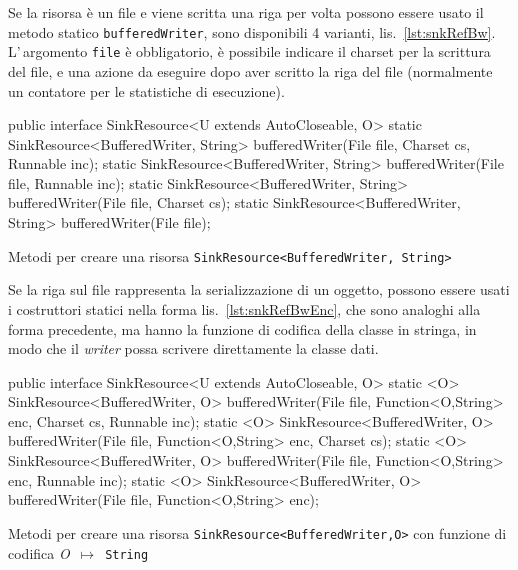 Se la risorsa è un file e viene scritta una riga per volta possono essere usato
il metodo statico \texttt{bufferedWriter}, sono disponibili 4 varianti,
lis.~\ref{lst:snkRefBw}. L'\,argomento \texttt{file} è obbligatorio, è possibile
indicare il charset per la scrittura del file, e una azione da eseguire dopo
aver scritto la riga del file (normalmente un contatore per le statistiche di
esecuzione).

\begin{elisting}[!htb]
\begin{javacode}
public interface SinkResource<U extends AutoCloseable, O> {
    static SinkResource<BufferedWriter, String> bufferedWriter(File file, Charset cs, Runnable inc);
    static SinkResource<BufferedWriter, String> bufferedWriter(File file, Runnable inc);
    static SinkResource<BufferedWriter, String> bufferedWriter(File file, Charset cs);
    static SinkResource<BufferedWriter, String> bufferedWriter(File file);
}
\end{javacode}
\caption{Metodi per creare una risorsa \texttt{SinkResource<BufferedWriter, String>}}
\label{lst:snkRefBw}
\end{elisting}

Se la riga sul file rappresenta la serializzazione di un oggetto, possono essere
usati i costruttori statici nella forma lis.~\ref{lst:snkRefBwEnc}, che sono
analoghi alla forma precedente, ma hanno la funzione di codifica della classe
in stringa, in modo che il \textit{writer} possa scrivere direttamente la classe
dati.

\begin{elisting}[!htb]
\begin{javacode}
public interface SinkResource<U extends AutoCloseable, O> {
    static <O> SinkResource<BufferedWriter, O> bufferedWriter(File file, Function<O,String> enc, Charset cs,
                                                              Runnable inc);
    static <O> SinkResource<BufferedWriter, O> bufferedWriter(File file, Function<O,String> enc, Charset cs);
    static <O> SinkResource<BufferedWriter, O> bufferedWriter(File file, Function<O,String> enc, Runnable inc);
    static <O> SinkResource<BufferedWriter, O> bufferedWriter(File file, Function<O,String> enc);
}
\end{javacode}
\caption[Metodi per creare una risorsa \texttt{SinkResource<BufferedWriter,O>}
con funzione di codifica]{Metodi per creare una risorsa \texttt{SinkResource<BufferedWriter,O>}
con funzione di codifica \textit{O}~$\mapsto$~\texttt{String}}
\label{lst:snkRefBwEnc}
\end{elisting}

